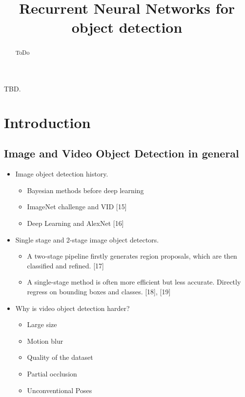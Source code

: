 \documentclass[conference]{IEEEtran}
\begin{document}
\title{Recurrent Neural Networks for object detection}

\author{
\and
{}
}

\maketitle

\begin{abstract}
ToDo
\end{abstract}

\begin{IEEEkeywords}
TBD.
\end{IEEEkeywords}

\section{Introduction}

\subsection{Image and Video Object Detection in general}
\begin{itemize}
	\item Image object detection history.
	\begin{itemize}
		\item Bayesian methods before deep learning
		\item ImageNet challenge and VID [15]
		\item Deep Learning and AlexNet [16]
	\end{itemize}
	\item Single stage and 2-stage image object detectors.
	\begin{itemize}
		\item A two-stage pipeline firstly generates region proposals, which are then classified and refined. [17]
		\item A single-stage method is often more efficient but less accurate. Directly regress on bounding boxes and classes. [18], [19]
	\end{itemize}
	\item Why is video object detection harder?
	\begin{itemize}
		\item Large size
		\item Motion blur
		\item Quality of the dataset
		\item Partial occlusion
		\item Unconventional Poses
	\end{itemize}
\end{itemize}
\end{document}
